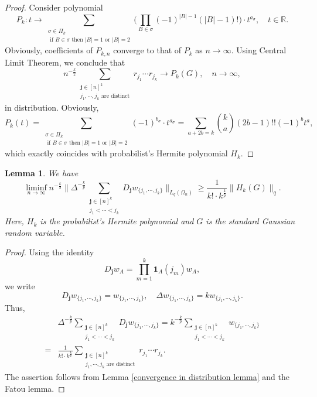 \documentclass{amsart}
\numberwithin{equation}{section}
\newtheorem{lem}[thm]{Lemma}
\theoremstyle{definition}
\theoremstyle{remark}
\newcommand{\1}{\mathbf 1}
\begin{document}
\begin{proof}
Consider polynomial
$$P_k:t\to \sum_{\substack{\sigma\in\Pi_k\\ \mbox{ if }B\in\sigma\mbox{ then }|B|=1\mbox{ or }|B|=2}}
\Big(\prod_{B\in\sigma}
(-1)^{|B|-1}(|B|-1)!\Big)\cdot t^{a_{\sigma}},\quad t\in\mathbb{R}.$$
Obviously, coefficients of $P_{k,n}$ converge to that of $P_k$ as $n\to\infty.$ Using Central Limit Theorem, we conclude that
$$n^{-\frac{k}{2}}\sum_{\substack{\mathbf{j}\in [n]^k\\
j_1,\cdots,j_k\mbox{ are distinct}}}r_{j_1}\cdots r_{j_k}\to P_k(G),\quad n\to\infty,$$
in distribution. Obviously,
$$P_k(t)=\sum_{\substack{\sigma\in\Pi_k\\ \mbox{ if }B\in\sigma\mbox{ then }|B|=1\mbox{ or }|B|=2}}
(-1)^{b_{\sigma}}\cdot t^{a_{\sigma}}=\sum_{a+2b=k}\binom{k}{a} (2b-1)!!(-1)^bt^a,$$
which exactly coincides with probabilist's Hermite polynomial $H_k.$
\end{proof}



\begin{lem}\label{hermite gauss lemma} We have
$$\liminf_{n\to\infty}n^{-\frac{k}{2}}\|\Delta^{-\frac{k}{p}}\sum_{\substack{\mathbf{j}\in [n]^k\\ j_1<\cdots<j_k}}D_{\mathbf{j}}w_{\{j_1,\cdots,j_k\}}\|_{L_q(\Omega_n)}\geq \frac1{k!\cdot k^{\frac{k}{p}}}\|H_k(G)\|_q.$$
Here, $H_k$ is the probabilist's Hermite polynomial and $G$ is the standard Gaussian random variable.
\end{lem}
\begin{proof}
Using the identity
$$
D_{\mathbf{j}}w_A=\prod_{m=1}^k\1_A(j_m) w_A,
$$
we write
$$
D_{\mathbf{j}}w_{\{j_1,\cdots,j_k\}}=w_{\{j_1,\cdots,j_k\}},\quad \Delta w_{\{j_1,\cdots,j_k\}}= k w_{\{j_1,\cdots,j_k\}}.
$$
Thus,
\begin{align*}
&\Delta^{-\frac{k}{p}}\sum_{\substack{\mathbf{j}\in [n]^k\\ j_1<\cdots<j_k}}D_{\mathbf{j}}w_{\{j_1,\cdots,j_k\}}=k^{-\frac{k}{p}}\sum_{\substack{\mathbf{j}\in [n]^k\\ j_1<\cdots<j_k}}w_{\{j_1,\cdots,j_k\}}\\
=&\frac1{k!\cdot k^{\frac{k}{p}}}\sum_{\substack{\mathbf{j}\in [n]^k\\ j_1,\cdots,j_k\mbox{ are distinct}}}r_{j_1}\cdots r_{j_k}.
\end{align*}
The assertion follows from Lemma \ref{convergence in distribution lemma} and the Fatou lemma.
\end{proof}
\end{document}
